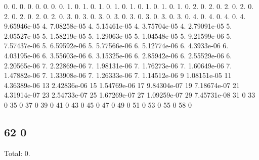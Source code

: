 0. 0. 0. 0. 0. 0. 0. 0. 1. 0. 1. 0. 1. 0. 1. 0. 1. 0. 1. 0. 1. 0. 1. 0. 2. 0. 2. 0. 2. 0. 2. 0. 2. 0. 2. 0. 2. 0. 2. 0. 3. 0. 3. 0. 3. 0. 3. 0. 3. 0. 3. 0. 3. 0. 3. 0. 4. 0. 4. 0. 4. 0. 4. 9.\+65946e-\/05 4. 7.\+08258e-\/05 4. 5.\+15461e-\/05 4. 3.\+75704e-\/05 4. 2.\+79091e-\/05 5. 2.\+05527e-\/05 5. 1.\+58219e-\/05 5. 1.\+29063e-\/05 5. 1.\+04548e-\/05 5. 9.\+21599e-\/06 5. 7.\+57437e-\/06 5. 6.\+59592e-\/06 5. 5.\+77566e-\/06 6. 5.\+12774e-\/06 6. 4.\+3933e-\/06 6. 4.\+03195e-\/06 6. 3.\+55603e-\/06 6. 3.\+15325e-\/06 6. 2.\+85942e-\/06 6. 2.\+55529e-\/06 6. 2.\+20565e-\/06 7. 2.\+22869e-\/06 7. 1.\+98131e-\/06 7. 1.\+76273e-\/06 7. 1.\+60649e-\/06 7. 1.\+47882e-\/06 7. 1.\+33908e-\/06 7. 1.\+26333e-\/06 7. 1.\+14512e-\/06 9 1.\+08151e-\/05 11 4.\+36389e-\/06 13 2.\+42836e-\/06 15 1.\+54769e-\/06 17 9.\+84304e-\/07 19 7.\+18674e-\/07 21 4.\+31914e-\/07 23 2.\+54733e-\/07 25 1.\+67269e-\/07 27 1.\+09259e-\/07 29 7.\+45731e-\/08 31 0 33 0 35 0 37 0 39 0 41 0 43 0 45 0 47 0 49 0 51 0 53 0 55 0 58 0 \subsection*{62 0 }

Total\+: 0. 